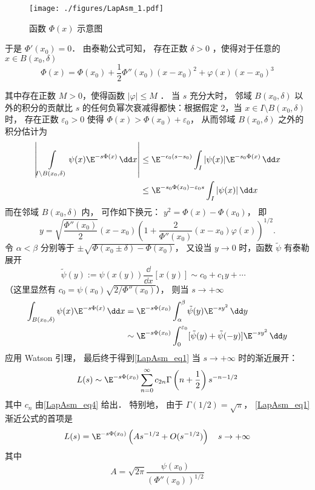 \begin{figure}[ht]
  \centering
  \texttt{[image: ./figures/LapAsm\_1.pdf]}
  \caption{函数 $\Phi(x)$ 示意图} \label{LapAsm_fig1}
\end{figure}

于是 $\Phi'(x_0)=0$． 由泰勒公式可知， 存在正数 $\delta>0$ ，使得对于任意的 $x\in B(x_0,\delta)$  
\[
  \Phi(x)=\Phi(x_0)+\frac{1}{2}\Phi''(x_0)(x-x_0)^2+\varphi(x)(x-x_0)^3
\]

其中存在正数 $M>0$，使得函数 $|\varphi|\leq M$ ． 当 $s$ 充分大时， 邻域 $B(x_0,\delta)$ 以外的积分的贡献比 $s$ 的任何负幂次衰减得都快：根据假定 2，当 $x\in I\setminus B(x_0,\delta)$ 时， 存在正数 $\varepsilon_0>0$ 使得 $\Phi(x)>\Phi(x_0)+\varepsilon_0$， 从而邻域 $B(x_0,\delta)$ 之外的积分估计为
\begin{align*}
    \left|\int\limits_{I\setminus B(x_0,\delta)}\psi(x)\E^{-s\Phi(x)}\,\dd x\right|
    &\leq \E^{-\epsilon_0(s-s_0)}\int_I|\psi(x)|\E^{-s_0\Phi(x)}\,\dd x\nonumber\\
    &\leq \E^{-s_0\Phi(x_0)-\varepsilon_0s}\int_{I}|\psi(x)|\,\dd x\nonumber
\end{align*}
而在邻域 $B(x_0,\delta)$ 内， 可作如下换元： $y^2=\Phi(x)-\Phi(x_0)$， 即
\[
  y=\sqrt{\frac{\Phi''(x_0)}{2}}(x-x_0)\left(1+\frac{2}{\Phi''(x_0)}(x-x_0)\varphi(x)\right)^{1/2}.
\]
令 $\alpha<\beta$ 分别等于 $\pm\sqrt{\Phi(x_0\pm\delta)-\Phi(x_0)}$， 又设当 $y\to0$ 时，函数 $\tilde{\psi}$ 有泰勒展开
\begin{equation}\label{LapAsm_eq4}
  \tilde{\psi}(y):=\psi(x(y))\frac{\dd}{\dd x}[x(y)]\sim c_0+c_1y+\cdots \quad 
  \end{equation}
  （这里显然有 $c_0=\psi(x_0)\sqrt{2/\Phi''(x_0)}$）， 则当 $s\to+\infty$
  $$
  \begin{aligned}
  \int_{B(x_0,\delta)}\psi(x)\E^{-s\Phi(x)}\,\dd x
  &=\E^{-s\Phi(x_0)}\int_{\alpha}^{\beta}\tilde \psi(y)\E^{-sy^2}\,\dd y\\
  &\sim\E^{-s\Phi(x_0)}\int_{0}^{\varepsilon_0}[\tilde \psi(y)+\tilde \psi(-y)]\E^{-sy^2}\,\dd y
\end{aligned}
$$
应用 Watson 引理， 最后终于得到\autoref{LapAsm_eq1} 当 $s\to+\infty$ 时的渐近展开：
\begin{equation}\label{LapAsm_eq5}
  L(s)\sim \E^{-s\Phi(x_0)}\sum_{n=0}^\infty c_{2n}\Gamma\left(n+\frac{1}{2}\right)s^{-n-1/2}
\end{equation}
其中 $c_n$ 由\autoref{LapAsm_eq4} 给出． 特别地， 由于 $\Gamma(1/2)=\sqrt{\pi}$， \autoref{LapAsm_eq1} 渐近公式的首项是
\[
  L(s)=\E^{-s\Phi(x_0)}\left(As^{-1/2}+O(s^{-1/2})\right)\quad s\to+\infty
\]
其中
\[
  A=\sqrt{2\pi}\frac{\psi(x_0)}{(\Phi''(x_0))^{1/2}}
\]

